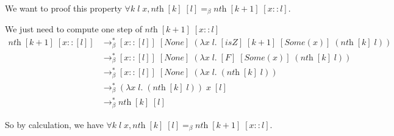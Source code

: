 \documentclass{article}
\theoremstyle{plain}
\newcommand{\rsbeta}{\to_\beta^*}
\newcommand{\nth}{\textit{nth}}
\newcommand{\none}{[\textit{None}]}
\begin{document}
  We want to proof this property $\forall k\;l\;x, \textit{nth}\; [k]\; [l]
  =_\beta \textit{nth}\;[k+1]\;[x :: l]$.

  \proof We just need to compute one step of $\nth\;[k+1]\;[x::l]$
  \begin{align*}
    \nth\;[k+1]\;[x::[l]] &\rsbeta [x::[l]]\; \none\; 
    (\lambda x\;l.\;[\textit{isZ}]\; [k+1]\; [\textit{Some}(x)]\;
    (\nth\;[k]\;l)) \\
    &\rsbeta [x::[l]]\; \none\; 
    (\lambda x\;l.\;[F]\; [\textit{Some}(x)]\;
    (\nth\;[k]\;l)) \\
    &\rsbeta [x::[l]]\; \none\; 
    (\lambda x\;l.\;(\nth\;[k]\;l)) \\
    &\rsbeta (\lambda x\;l.\;(\nth\;[k]\;l))\;x\;[l]\\
    &\rsbeta \nth\;[k]\;[l]
  \end{align*}

  So by calculation, we have $\forall k\;l\;x, \textit{nth}\; [k]\; [l]
  =_\beta \textit{nth}\;[k+1]\;[x :: l]$.
\end{document}
